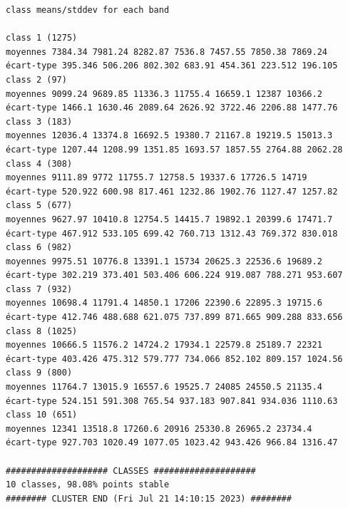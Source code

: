 \documentclass[environments,article,submit,pdftex,moreauthors]{Definitions/mdpi}
\begin{document}
\begin{scriptsize}
\begin{verbatim}
class means/stddev for each band

class 1 (1275)
moyennes 7384.34 7981.24 8282.87 7536.8 7457.55 7850.38 7869.24
écart-type 395.346 506.206 802.302 683.91 454.361 223.512 196.105
class 2 (97)
moyennes 9099.24 9689.85 11336.3 11755.4 16659.1 12387 10366.2
écart-type 1466.1 1630.46 2089.64 2626.92 3722.46 2206.88 1477.76
class 3 (183)
moyennes 12036.4 13374.8 16692.5 19380.7 21167.8 19219.5 15013.3
écart-type 1207.44 1208.99 1351.85 1693.57 1857.55 2764.88 2062.28
class 4 (308)
moyennes 9111.89 9772 11755.7 12758.5 19337.6 17726.5 14719
écart-type 520.922 600.98 817.461 1232.86 1902.76 1127.47 1257.82
class 5 (677)
moyennes 9627.97 10410.8 12754.5 14415.7 19892.1 20399.6 17471.7
écart-type 467.912 533.105 699.42 760.713 1312.43 769.372 830.018
class 6 (982)
moyennes 9975.51 10776.8 13391.1 15734 20625.3 22536.6 19689.2
écart-type 302.219 373.401 503.406 606.224 919.087 788.271 953.607
class 7 (932)
moyennes 10698.4 11791.4 14850.1 17206 22390.6 22895.3 19715.6
écart-type 412.746 488.688 621.075 737.899 871.665 909.288 833.656
class 8 (1025)
moyennes 10666.5 11576.2 14724.2 17934.1 22579.8 25189.7 22321
écart-type 403.426 475.312 579.777 734.066 852.102 809.157 1024.56
class 9 (800)
moyennes 11764.7 13015.9 16557.6 19525.7 24085 24550.5 21135.4
écart-type 524.151 591.308 765.54 937.183 907.841 934.036 1110.63
class 10 (651)
moyennes 12341 13518.8 17260.6 20916 25330.8 26965.2 23734.4
écart-type 927.703 1020.49 1077.05 1023.42 943.426 966.84 1316.47

#################### CLASSES ####################
10 classes, 98.08% points stable
######## CLUSTER END (Fri Jul 21 14:10:15 2023) ########
\end{verbatim}
\end{scriptsize}
\end{document}
